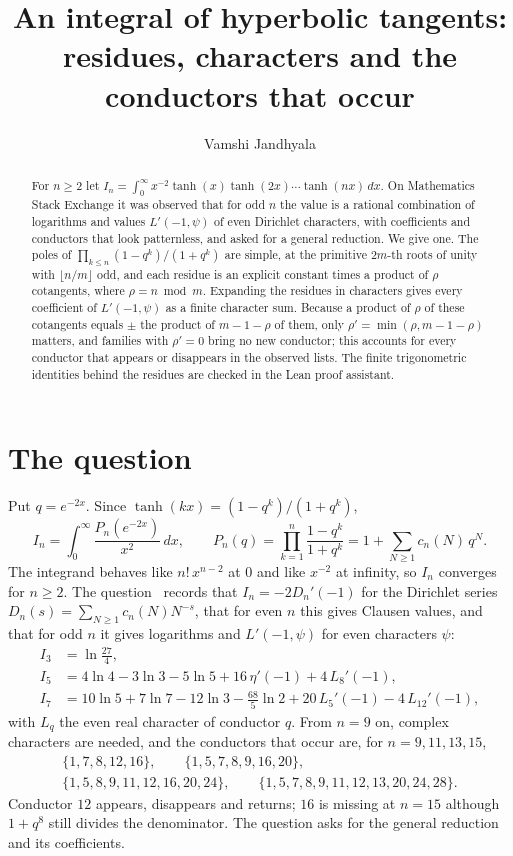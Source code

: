 \documentclass[11pt]{article}
\title{An integral of hyperbolic tangents: \\ residues, characters and the conductors that occur}
\author{Vamshi Jandhyala}
\date{}
\begin{document}
\maketitle
\vspace{-2em}

\begin{abstract}
For $n\ge2$ let $I_n=\int_0^\infty x^{-2}\tanh(x)\tanh(2x)\cdots\tanh(nx)\,dx$. On Mathematics Stack Exchange it was
observed that for odd $n$ the value is a rational combination of logarithms and values $L'(-1,\psi)$ of even
Dirichlet characters, with coefficients and conductors that look patternless, and asked for a general reduction.
We give one. The poles of $\prod_{k\le n}(1-q^k)/(1+q^k)$ are simple, at the primitive $2m$-th roots of unity with
$\lfloor n/m\rfloor$ odd, and each residue is an explicit constant times a product of $\rho$ cotangents, where
$\rho=n\bmod m$. Expanding the residues in characters gives every coefficient of $L'(-1,\psi)$ as a finite character
sum. Because a product of $\rho$ of these cotangents equals $\pm$ the product of $m-1-\rho$ of them, only
$\rho'=\min(\rho,m-1-\rho)$ matters, and families with $\rho'=0$ bring no new conductor; this accounts for every
conductor that appears or disappears in the observed lists. The finite trigonometric identities behind the residues
are checked in the Lean proof assistant.
\end{abstract}

\section{The question}

Put $q=e^{-2x}$. Since $\tanh(kx)=(1-q^k)/(1+q^k)$,
\[
I_n=\int_0^\infty \frac{P_n(e^{-2x})}{x^2}\,dx,\qquad P_n(q)=\prod_{k=1}^{n}\frac{1-q^k}{1+q^k}=1+\sum_{N\ge1}c_n(N)\,q^N .
\]
The integrand behaves like $n!\,x^{n-2}$ at $0$ and like $x^{-2}$ at infinity, so $I_n$ converges for $n\ge2$. The
question~\cite{MSE} records that $I_n=-2D_n'(-1)$ for the Dirichlet series $D_n(s)=\sum_{N\ge1}c_n(N)N^{-s}$, that for
even $n$ this gives Clausen values, and that for odd $n$ it gives logarithms and $L'(-1,\psi)$ for even characters
$\psi$:
\begin{align*}
I_3&=\ln\tfrac{27}{4},\\
I_5&=4\ln4-3\ln3-5\ln5+16\,\eta'(-1)+4\,L_8'(-1),\\
I_7&=10\ln5+7\ln7-12\ln3-\tfrac{68}{5}\ln2+20\,L_5'(-1)-4\,L_{12}'(-1),
\end{align*}
with $L_q$ the even real character of conductor $q$. From $n=9$ on, complex characters are needed, and the
conductors that occur are, for $n=9,11,13,15$,
\begin{gather*}
\{1,7,8,12,16\},\qquad\{1,5,7,8,9,16,20\},\\
\{1,5,8,9,11,12,16,20,24\},\qquad\{1,5,7,8,9,11,12,13,20,24,28\}.
\end{gather*}
Conductor $12$ appears, disappears and returns; $16$ is missing at $n=15$ although $1+q^8$ still divides the
denominator. The question asks for the general reduction and its coefficients.
\end{document}
